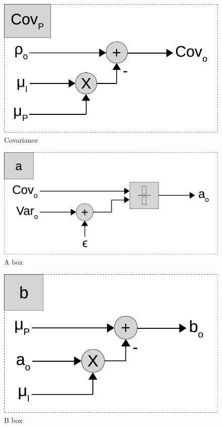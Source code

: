 \begin{figure}[ht!]
  \centering
  \includegraphics[scale=0.3]{figures/cov_par}
  \caption{Covariance}
  \label{fig:cov_par}
\end{figure}

\begin{figure}[ht!]
  \centering
  \includegraphics[scale=0.3]{figures/a_par}
  \caption{A box}
  \label{fig:a_par}
\end{figure}

\begin{figure}[ht!]
  \centering
  \includegraphics[scale=0.3]{figures/b_par}
  \caption{B box}
  \label{fig:b_par}
\end{figure}

